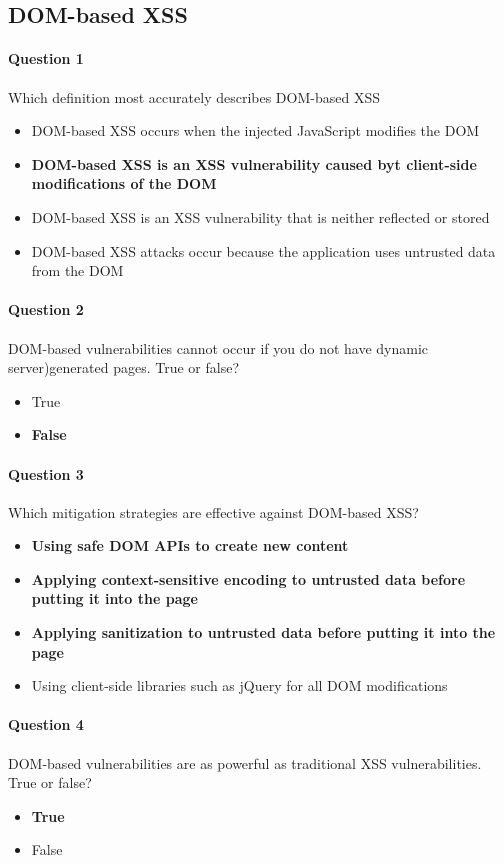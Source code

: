 \documentclass[titlepage]{article}
\begin{document}
    \subsection{DOM-based XSS}
    \paragraph{Question 1} Which definition most accurately describes DOM-based XSS
    \begin{itemize}
        \item DOM-based XSS occurs when the injected JavaScript modifies the DOM
        \item \textbf{DOM-based XSS is an XSS vulnerability caused byt client-side modifications of the DOM} \checkmark
        \item DOM-based XSS is an XSS vulnerability that is neither reflected or stored
        \item DOM-based XSS attacks occur because the application uses untrusted data from the DOM
    \end{itemize}
    \paragraph{Question 2} DOM-based vulnerabilities cannot occur if you do not have dynamic server)generated pages. True or false?
    \begin{itemize}
        \item True
        \item \textbf{False} \checkmark
    \end{itemize}
    \paragraph{Question 3} Which mitigation strategies are effective against DOM-based XSS?
    \begin{itemize}
        \item \textbf{Using safe DOM APIs to create new content} \checkmark
        \item \textbf{Applying context-sensitive encoding to untrusted data before putting it into the page} \checkmark
        \item \textbf{Applying sanitization to untrusted data before putting it into the page} \checkmark
        \item Using client-side libraries such as jQuery for all DOM modifications
    \end{itemize}
    \paragraph{Question 4} DOM-based vulnerabilities are as powerful as traditional XSS vulnerabilities. True or false?
    \begin{itemize}
        \item \textbf{True} \checkmark
        \item False
    \end{itemize}
\end{document}
